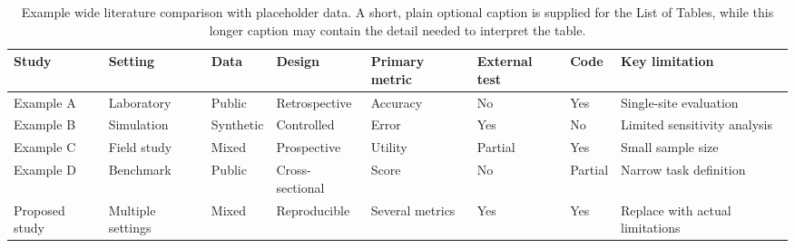 \begin{table}
  \centering
  \scriptsize
  \caption[Example wide literature comparison.]{Example wide literature comparison with placeholder data. A short, plain optional caption is supplied for the List of Tables, while this longer caption may contain the detail needed to interpret the table.}
  \label{tab:wide-review}
  \begin{tabularx}{0.92\textheight}{@{}L{31mm}*{7}{>{\centering\arraybackslash}X}@{}}
    \toprule
    \textbf{Study} & \textbf{Setting} & \textbf{Data} & \textbf{Design} & \textbf{Primary metric} & \textbf{External test} & \textbf{Code} & \textbf{Key limitation} \\
    \midrule
    Example A \parencite{example2024} & Laboratory & Public & Retrospective & Accuracy & No & Yes & Single-site evaluation \\
    Example B \parencite{example2025} & Simulation & Synthetic & Controlled & Error & Yes & No & Limited sensitivity analysis \\
    Example C & Field study & Mixed & Prospective & Utility & Partial & Yes & Small sample size \\
    Example D & Benchmark & Public & Cross-sectional & Score & No & Partial & Narrow task definition \\
    Proposed study & Multiple settings & Mixed & Reproducible & Several metrics & Yes & Yes & Replace with actual limitations \\
    \bottomrule
  \end{tabularx}
\end{table}
